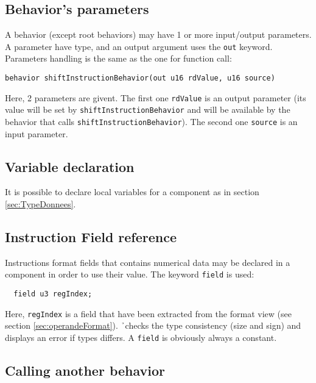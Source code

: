\subsection{Behavior's parameters}

A behavior (except root behaviors) may have 1 or more input/output parameters. A parameter have type, and an output argument uses the \texttt{out} keyword. Parameters handling is the same as the one for function call: 
\begin{lstlisting}
behavior shiftInstructionBehavior(out u16 rdValue, u16 source)
\end{lstlisting}
Here, 2 parameters are givent. The first one \texttt{rdValue} is an output parameter (its value will be set by \texttt{shiftInstructionBehavior} and will be available by the behavior that calls \texttt{shiftInstructionBehavior}). The second one \texttt{source} is an input parameter.

\subsection{Variable declaration}
\label{sec:behVar}

It is possible to declare local variables for a component as in section \ref{sec:TypeDonnees}.

\subsection{Instruction Field reference}
\label{sec:behField}

Instructions format fields that contains numerical data may be declared in a component in order to use their value. The keyword \texttt{field} is used:
\begin{lstlisting}
  field u3 regIndex;
\end{lstlisting}
Here, \texttt{regIndex} is a field that have been extracted from the format view (see section \ref{sec:operandeFormat}). \h\ checks the type consistency (size and sign) and displays an error if types differs. A \texttt{field} is obviously always a constant.

\subsection{Calling another behavior}
\label{sec:behSubBeh}

